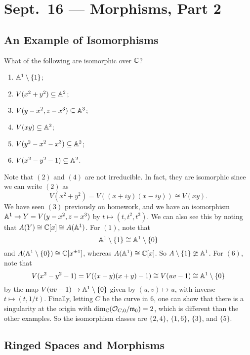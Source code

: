 \chapter{Sept.~16 --- Morphisms, Part 2}

\section{An Example of Isomorphisms}
\begin{example}\label{ex:isomorphism}
  What of the following are isomorphic
  over $\mathbb{C}$?
  \begin{enumerate}
    \item $\mathbb{A}^1 \setminus \{1\}$;
    \item $V(x^2 + y^2) \subseteq \mathbb{A}^2$;
    \item $V(y - x^2, z - x^3) \subseteq \mathbb{A}^3$;
    \item $V(xy) \subseteq \mathbb{A}^2$;
    \item $V(y^2 - x^2 - x^3) \subseteq \mathbb{A}^2$;
    \item $V(x^2 - y^2 - 1) \subseteq \mathbb{A}^2$.
  \end{enumerate}
  Note that $(2)$ and $(4)$ are not
  irreducible. In fact, they are isomorphic
  since we can write $(2)$ as
  \[
    V(x^2 + y^2)
    = V((x + iy)(x - iy))
    \cong V(xy).
  \]
  We have seen $(3)$ previously on
  homework, and we have an isomorphism
  $\mathbb{A}^1 \to Y = V(y - x^2, z - x^3)$
  by $t \mapsto (t, t^2, t^3)$.
  We can also see this by noting that
  $A(Y) \cong \mathbb{C}[x] \cong A(\mathbb{A}^1)$.
  For $(1)$, note that
  \[
    \mathbb{A}^1 \setminus \{1\}
    \cong \mathbb{A}^1 \setminus \{0\}
  \]
  and $A(\mathbb{A}^1 \setminus \{0\}) \cong \mathbb{C}[x^{\pm 1}]$,
  whereas $A(\mathbb{A}^1) \cong \mathbb{C}[x]$.
  So $A \setminus \{1\} \ncong \mathbb{A}^1$.
  For $(6)$, note that
  \[
    V(x^2 - y^2 - 1)
    = V((x - y)(x + y) - 1)
    \cong V(uv - 1)
    \cong \mathbb{A}^1 \setminus \{0\}
  \]
  by the map
  $V(uv - 1) \to \mathbb{A}^1 \setminus \{0\}$
  given by $(u, v) \mapsto u$,
  with inverse $t \mapsto (t, 1 / t)$.
  Finally, letting $C$ be the curve in
  $6$, one can show that there is
  a singularity at the origin with
  $\dim_{\mathbb{C}} (\mathcal{O}_{C, 0} / \mathfrak{m}_0) = 2$,
  which is different than the other examples.
  So the isomorphism classes are
  $\{2, 4\}$, $\{1, 6\}$, $\{3\}$, and $\{5\}$.
\end{example}

\section{Ringed Spaces and Morphisms}

